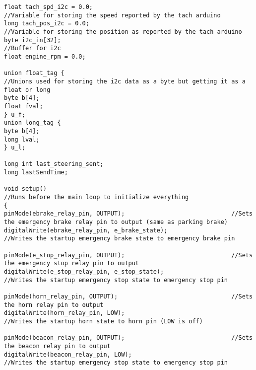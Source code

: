 \begin{lstlisting}[breaklines=true,basicstyle=\tiny]
float tach_spd_i2c = 0.0;                                         //Variable for storing the speed reported by the tach arduino
long tach_pos_i2c = 0.0;                                          //Variable for storing the position as reported by the tach arduino
byte i2c_in[32];                                                  //Buffer for i2c 
float engine_rpm = 0.0;

union float_tag {                                                  //Unions used for storing the i2c data as a byte but getting it as a float or long
byte b[4];
float fval;
} u_f;
union long_tag {
byte b[4];
long lval;
} u_l;

long int last_steering_sent;
long lastSendTime;

void setup()                                                      //Runs before the main loop to initialize everything
{
pinMode(ebrake_relay_pin, OUTPUT);                              //Sets the emergency brake relay pin to output (same as parking brake)
digitalWrite(ebrake_relay_pin, e_brake_state);                  //Writes the startup emergency brake state to emergency brake pin

pinMode(e_stop_relay_pin, OUTPUT);                              //Sets the emergency stop relay pin to output
digitalWrite(e_stop_relay_pin, e_stop_state);                   //Writes the startup emergency stop state to emergency stop pin

pinMode(horn_relay_pin, OUTPUT);                                //Sets the horn relay pin to output
digitalWrite(horn_relay_pin, LOW);                              //Writes the startup horn state to horn pin (LOW is off)

pinMode(beacon_relay_pin, OUTPUT);                              //Sets the beacon relay pin to output 
digitalWrite(beacon_relay_pin, LOW);                            //Writes the startup emergency stop state to emergency stop pin


\end{lstlisting}
